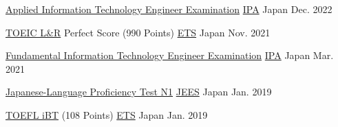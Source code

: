 
\begin{cvhonors}

  \cvhonor
    {\href{https://www.ipa.go.jp/shiken/kubun/ap.html}{Applied Information Technology Engineer Examination}} %
    {\href{https://www.ipa.go.jp/index.html}{IPA}} %
    {Japan} %
    {Dec. 2022} %

  \cvhonor
    {\href{https://www.iibc-global.org/toeic.html}{TOEIC L\&R} Perfect Score (990 Points)} %
    {\href{https://www.ets.org/}{ETS}} %
    {Japan} %
    {Nov. 2021} %

  \cvhonor
    {\href{https://www.ipa.go.jp/shiken/kubun/fe.html}{Fundamental Information Technology Engineer Examination}} %
    {\href{https://www.ipa.go.jp/index.html}{IPA}} %
    {Japan} %
    {Mar. 2021} %

  \cvhonor
    {\href{https://www.jlpt.jp/}{Japanese-Language Proficiency Test N1}} %
    {\href{http://www.jees.or.jp/}{JEES}} %
    {Japan} %
    {Jan. 2019} %

  \cvhonor
    {\href{https://www.ets.org/toefl.html}{TOEFL iBT} (108 Points)} %
    {\href{https://www.ets.org/}{ETS}} %
    {Japan} %
    {Jan. 2019} %
\end{cvhonors}
